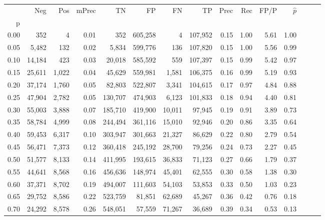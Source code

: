 \begin{tabular}{rrrrrrrrrrrrrrr}
\toprule
{} &     Neg &    Pos & mPrec &       TN &       FP &       FN &       TP &  Prec &   Rec &  FP/P & $\hat{p}$ \\
p    &         &        &       &          &          &          &          &       &       &       &           \\
\midrule
0.00 &     352 &      4 &  0.01 &      352 &  605,258 &        4 &  107,952 &  0.15 &  1.00 &  5.61 &      1.00 \\
0.05 &   5,482 &    132 &  0.02 &    5,834 &  599,776 &      136 &  107,820 &  0.15 &  1.00 &  5.56 &      0.99 \\
0.10 &  14,184 &    423 &  0.03 &   20,018 &  585,592 &      559 &  107,397 &  0.15 &  0.99 &  5.42 &      0.97 \\
0.15 &  25,611 &  1,022 &  0.04 &   45,629 &  559,981 &    1,581 &  106,375 &  0.16 &  0.99 &  5.19 &      0.93 \\
0.20 &  37,174 &  1,760 &  0.05 &   82,803 &  522,807 &    3,341 &  104,615 &  0.17 &  0.97 &  4.84 &      0.88 \\
0.25 &  47,904 &  2,782 &  0.05 &  130,707 &  474,903 &    6,123 &  101,833 &  0.18 &  0.94 &  4.40 &      0.81 \\
0.30 &  55,003 &  3,888 &  0.07 &  185,710 &  419,900 &   10,011 &   97,945 &  0.19 &  0.91 &  3.89 &      0.73 \\
0.35 &  58,784 &  4,999 &  0.08 &  244,494 &  361,116 &   15,010 &   92,946 &  0.20 &  0.86 &  3.35 &      0.64 \\
0.40 &  59,453 &  6,317 &  0.10 &  303,947 &  301,663 &   21,327 &   86,629 &  0.22 &  0.80 &  2.79 &      0.54 \\
0.45 &  56,471 &  7,373 &  0.12 &  360,418 &  245,192 &   28,700 &   79,256 &  0.24 &  0.73 &  2.27 &      0.45 \\
0.50 &  51,577 &  8,133 &  0.14 &  411,995 &  193,615 &   36,833 &   71,123 &  0.27 &  0.66 &  1.79 &      0.37 \\
0.55 &  44,641 &  8,568 &  0.16 &  456,636 &  148,974 &   45,401 &   62,555 &  0.30 &  0.58 &  1.38 &      0.30 \\
0.60 &  37,371 &  8,702 &  0.19 &  494,007 &  111,603 &   54,103 &   53,853 &  0.33 &  0.50 &  1.03 &      0.23 \\
0.65 &  29,752 &  8,586 &  0.22 &  523,759 &   81,851 &   62,689 &   45,267 &  0.36 &  0.42 &  0.76 &      0.18 \\
0.70 &  24,292 &  8,578 &  0.26 &  548,051 &   57,559 &   71,267 &   36,689 &  0.39 &  0.34 &  0.53 &      0.13 \\

\end{tabular}
